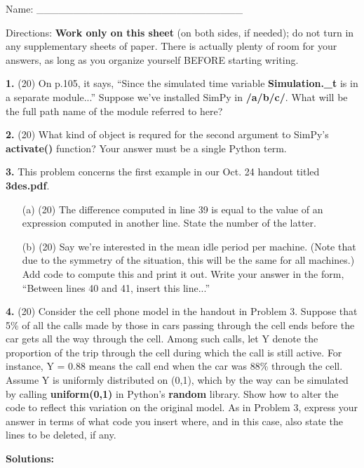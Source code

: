 \documentclass[twocolumn]{article}
\begin{document}
Name: \_\_\_\_\_\_\_\_\_\_\_\_\_\_\_\_\_\_\_\_\_\_\_\_\_\_\_\_

Directions: {\bf Work only on this sheet} (on both sides, if needed); do
not turn in any supplementary sheets of paper. There is actually plenty
of room for your answers, as long as you organize yourself BEFORE
starting writing.

{\bf 1.} (20) On p.105, it says, ``Since the simulated time variable {\bf
Simulation.\_t} is in a separate module...''  Suppose we've installed
SimPy in {\bf /a/b/c/}.  What will be the full path name of the module
referred to here?

{\bf 2.} (20) What kind of object is requred for the second argument to
SimPy's {\bf activate()} function?  Your answer must be a single Python
term.

{\bf 3.} This problem concerns the first example in our Oct. 24 handout
titled {\bf 3des.pdf}.

\begin{itemize}

\item [(a)] (20) The difference computed in line 39 is equal to the value
of an expression computed in another line.  State the number of the
latter.

\item [(b)] (20) Say we're interested in the mean idle period per machine.
(Note that due to the symmetry of the situation, this will be the same
for all machines.)  Add code to compute this and print it out.  Write
your answer in the form, ``Between lines 40 and 41, insert this
line...''

\end{itemize}

{\bf 4.} (20) Consider the cell phone model in the handout in Problem 3.
Suppose that 5\% of all the calls made by those in cars passing through
the cell ends before the car gets all the way through the cell.  Among
such calls, let Y denote the proportion of the trip through the cell
during which the call is still active.  For instance, Y = 0.88 means the
call end when the car was 88\% through the cell.   Assume Y is uniformly
distributed on (0,1), which by the way can be simulated by calling
{\bf uniform(0,1)} in Python's {\bf random} library.  Show how to alter
the code to reflect this variation on the original model.  As in Problem
3, express your answer in terms of what code you insert where, and in
this case, also state the lines to be deleted, if any.

{\bf Solutions:} 
\end{document}
